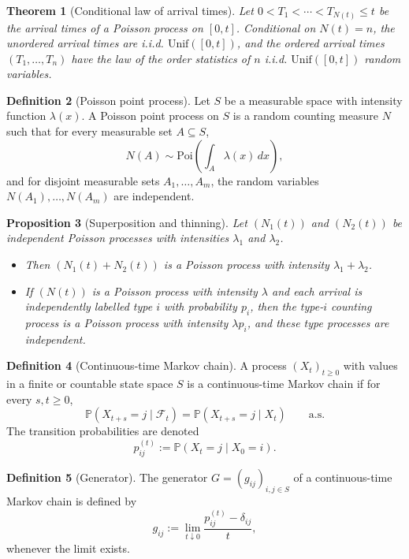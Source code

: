 \documentclass[11pt]{article}
\newtheorem{theorem}{Theorem}[section]
\newtheorem{proposition}[theorem]{Proposition}
\theoremstyle{definition}
\newtheorem{definition}[theorem]{Definition}
\begin{document}
\begin{theorem}[Conditional law of arrival times]
Let $0<T_1<\cdots<T_{N(t)}\le t$ be the arrival times of a Poisson process on $[0,t]$. Conditional on $N(t)=n$, the unordered arrival times are i.i.d. $\mathrm{Unif}([0,t])$, and the ordered arrival times $(T_1,\dots,T_n)$ have the law of the order statistics of $n$ i.i.d. $\mathrm{Unif}([0,t])$ random variables.
\end{theorem}

\begin{definition}[Poisson point process]
Let $S$ be a measurable space with intensity function $\lambda(x)$. A Poisson point process on $S$ is a random counting measure $N$ such that for every measurable set $A\subseteq S$,
\[
N(A)\sim \mathrm{Poi}\!\left(\int_A \lambda(x)\,dx\right),
\]
and for disjoint measurable sets $A_1,\dots,A_m$, the random variables $N(A_1),\dots,N(A_m)$ are independent.
\end{definition}

\begin{proposition}[Superposition and thinning]
Let $(N_1(t))$ and $(N_2(t))$ be independent Poisson processes with intensities $\lambda_1$ and $\lambda_2$.
\begin{itemize}[leftmargin=2em]
    \item Then $(N_1(t)+N_2(t))$ is a Poisson process with intensity $\lambda_1+\lambda_2$.
    \item If $(N(t))$ is a Poisson process with intensity $\lambda$ and each arrival is independently labelled type $i$ with probability $p_i$, then the type-$i$ counting process is a Poisson process with intensity $\lambda p_i$, and these type processes are independent.
\end{itemize}
\end{proposition}

\begin{definition}[Continuous-time Markov chain]
A process $(X_t)_{t\ge 0}$ with values in a finite or countable state space $S$ is a continuous-time Markov chain if for every $s,t\ge 0$,
\[
\mathbb P(X_{t+s}=j\mid \mathcal F_t)=\mathbb P(X_{t+s}=j\mid X_t)
\qquad \text{a.s.}
\]
The transition probabilities are denoted
\[
p_{ij}^{(t)}:=\mathbb P(X_t=j\mid X_0=i).
\]
\end{definition}

\begin{definition}[Generator]
The generator $G=(g_{ij})_{i,j\in S}$ of a continuous-time Markov chain is defined by
\[
g_{ij}:=\lim_{t\downarrow 0}\frac{p_{ij}^{(t)}-\delta_{ij}}{t},
\]
whenever the limit exists.
\end{definition}
\end{document}
